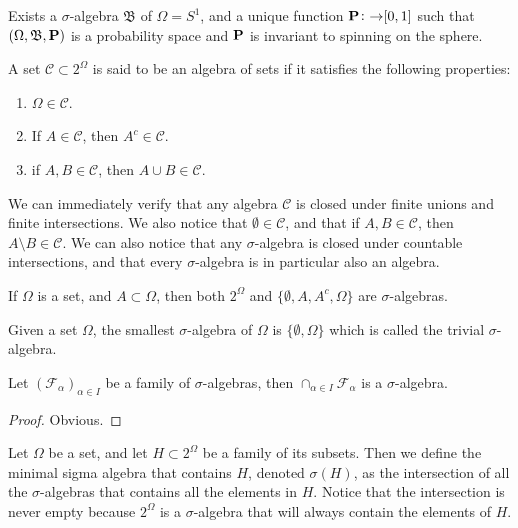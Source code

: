 \documentclass[11pt,a4paper]{article}
\begin{document}
  \begin{proposition}
    Exists a $\sigma$-algebra $\mathfrak B$ of $\Omega = S^1$, and a unique
    function $\mathbf{P} \colon \mathfrak \to [0,1]$ such that 
    $(\Omega, \mathfrak B, \mathbf{P})$ is a probability space and $\mathbf{P}$
    is invariant to spinning on the sphere.
  \end{proposition}

  \begin{definition}
    A set $\mathcal C \subset 2^\Omega$ is said to be an algebra of sets if it 
    satisfies the following properties:
    \begin{enumerate}
      \item $\Omega \in \mathcal C$.
      \item If $A \in \mathcal C$, then $A^c \in \mathcal C$.
      \item if $A,B \in \mathcal C$, then $A \cup B \in \mathcal C$.
    \end{enumerate}
  \end{definition}

  We can immediately verify that any algebra $\mathcal C$ is closed under
  finite unions and finite intersections. We also notice that 
  $\emptyset \in \mathcal C$, and that if $A,B \in \mathcal C$, then
  $A \setminus B \in \mathcal C$. We can also notice that any 
  $\sigma$-algebra is closed under countable intersections, and that
  every $\sigma$-algebra is in particular also an algebra.

  \begin{example}
    If $\Omega$ is a set, and $A \subset \Omega$, then both $2^\Omega$ and 
    $\{\emptyset, A, A^c, \Omega\}$ are $\sigma$-algebras.
  \end{example}

  \begin{example}
    Given a set $\Omega$, the smallest $\sigma$-algebra of $\Omega$ is
    $\{\emptyset, \Omega\}$ which is called the trivial $\sigma$-algebra.
  \end{example}
  
  \begin{proposition}
    Let $(\mathcal F_\alpha)_{\alpha \in I}$ be a family of $\sigma$-algebras,
    then $\cap_{\alpha \in I}{\mathcal F_\alpha}$ is a $\sigma$-algebra.
  \end{proposition}
  \begin{proof}
    Obvious.
  \end{proof}

  \begin{definition}
    Let $\Omega$ be a set, and let $H \subset 2^\Omega$ be a family of its
    subsets. Then we define the minimal sigma algebra that contains $H$,
    denoted $\sigma(H)$, as the intersection of all the $\sigma$-algebras
    that contains all the elements in $H$. Notice that the intersection is
    never empty because $2^\Omega$ is a $\sigma$-algebra that will always
    contain the elements of $H$.
  \end{definition}
\end{document}
